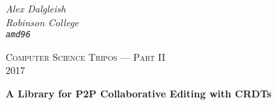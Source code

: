 \documentclass[12pt,a4paper]{report}
\begin{document}
 
  \begin{titlepage}
      \begin{flushright}
        \large
        \textit{Alex Dalgleish}
        \\
        \textit{Robinson College}
        \\
        \texttt{\textit{amd96}}
      \end{flushright}


    \vfill

    \begin{center}

      {\scshape Computer Science Tripos --- Part II}\\
      {\scshape 2017}
 
      {\huge\bfseries A Library for P2P Collaborative Editing with CRDTs\par}

    \vfill
    
    

    \end{center}
  \end{titlepage}\newpage
  \pagestyle{plain}\mbox{}\newpage
  


\tableofcontents








  
\end{document}

